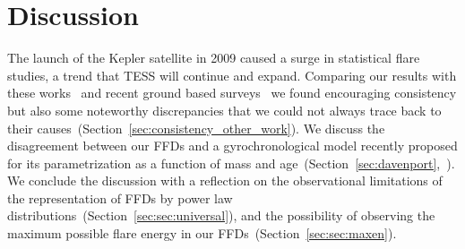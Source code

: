 \documentclass{aa}
\begin{document}
\section{Discussion}
\label{sec:discussion}
The launch of the Kepler satellite in 2009 caused a surge in statistical flare studies, a trend that TESS will continue and expand. Comparing our results with these works~\citep{shibayama2013,lurie2015,lin2019,raetz2020} and recent ground based surveys~\citep{chang2015,howard2019} we found encouraging consistency but also some noteworthy discrepancies that we could not always trace back to their causes~(Section~\ref{sec:consistency_other_work}). We discuss the disagreement between our FFDs and a gyrochronological model recently proposed for its parametrization as a function of mass and age~(Section~\ref{sec:davenport},~\citealt{davenport2019}). We conclude the discussion with a reflection on the observational limitations of the representation of FFDs by power law distributions~(Section~\ref{sec:sec:universal}), and the possibility of observing the maximum possible flare energy in our FFDs~(Section~\ref{sec:sec:maxen}).
\end{document}
